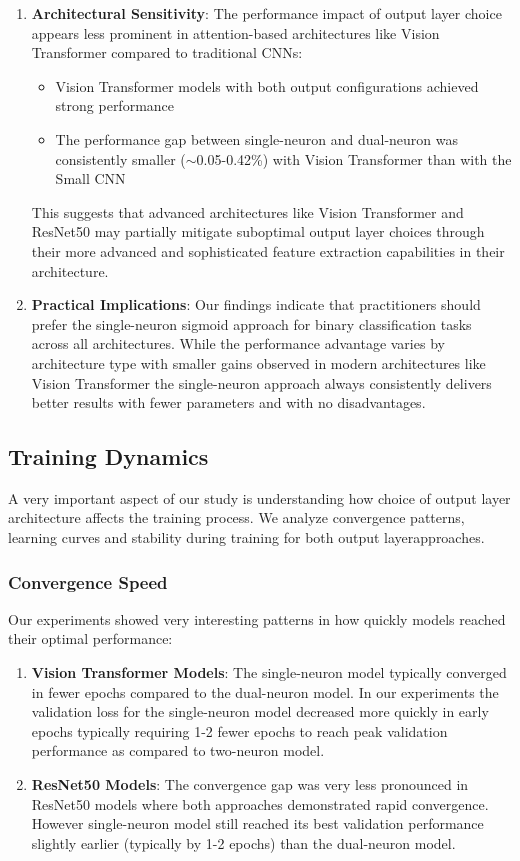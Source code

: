 \documentclass[11pt]{article}
\begin{document}
\begin{enumerate}
\item \textbf{Architectural Sensitivity}: The performance impact of output layer choice appears less prominent in attention-based architectures like Vision Transformer compared to traditional CNNs:
  \begin{itemize}
  \item Vision Transformer models with both output configurations achieved strong performance
  \item The performance gap between single-neuron and dual-neuron was consistently smaller ($\sim$0.05-0.42\%) with Vision Transformer than with the Small CNN
  \end{itemize}
  
  This suggests that advanced architectures like Vision Transformer and ResNet50 may partially mitigate suboptimal output layer choices through their more advanced and sophisticated feature extraction capabilities in their architecture.

\item \textbf{Practical Implications}: Our findings indicate that practitioners should prefer the single-neuron sigmoid approach for binary classification tasks across all architectures. While the performance advantage varies by architecture type with smaller gains observed in modern architectures like Vision Transformer the single-neuron approach always consistently delivers better results with fewer parameters and with no disadvantages.
\end{enumerate}

\subsection{Training Dynamics}
A very important aspect of our study is understanding how choice of output layer architecture affects the training process. We analyze convergence patterns, learning curves and stability during training for both output layerapproaches.

\subsubsection{Convergence Speed}
Our experiments showed very interesting patterns in how quickly models reached their optimal performance:

\begin{enumerate}
\item \textbf{Vision Transformer Models}: The single-neuron model typically converged in fewer epochs compared to the dual-neuron model. In our experiments the validation loss for the single-neuron model decreased more quickly in early epochs typically requiring 1-2 fewer epochs to reach peak validation performance as compared to two-neuron model.

\item \textbf{ResNet50 Models}: The convergence gap was very less pronounced in ResNet50 models where both approaches demonstrated rapid convergence. However single-neuron model still reached its best validation performance slightly earlier (typically by 1-2 epochs) than the dual-neuron model.
\end{enumerate}
\end{document}

